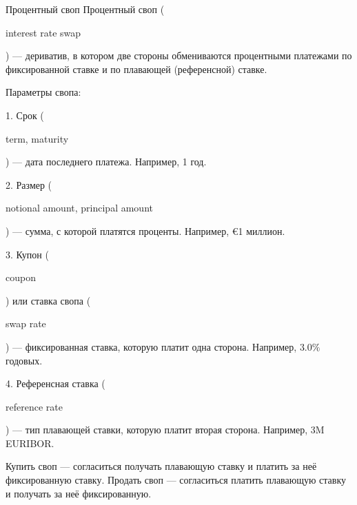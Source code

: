 \documentclass{beamer}
\renewcommand{\EUR}[1]{\textup{\euro}#1}
\newcommand{\en}[1]{\begin{otherlanguage}{english}#1\end{otherlanguage}}
\begin{document}
\begin{frame}{Процентный своп}
\justify
\alert{Процентный своп} (\en{interest rate swap}) --- дериватив, в котором две стороны 
обмениваются процентными платежами по фиксированной ставке и по плавающей (референсной) 
ставке. 

\justify
Параметры свопа:

1. Срок (\en{term, maturity}) --- дата последнего платежа. Например, 1 год.

2. Размер (\en{notional amount, principal amount}) --- сумма, с которой платятся проценты. Например, \EUR{1} миллион.

3. Купон (\en{coupon}) или ставка свопа (\en{swap rate}) --- фиксированная ставка, которую платит одна сторона. Например, $3.0\%$ годовых.

4. Референсная ставка (\en{reference rate}) --- тип плавающей ставки, которую платит вторая сторона. Например, 3M EURIBOR.

\justify
Купить своп --- согласиться получать плавающую ставку и платить за неё фиксированную ставку. Продать своп --- согласиться платить плавающую ставку и получать за неё фиксированную.
\end{frame}
\end{document}
